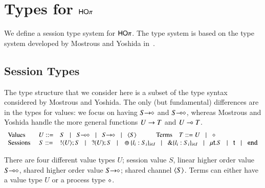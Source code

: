 \section{Types for $\mathsf{HO}\pi$}

We define a session type system for $\mathsf{HO}\pi$.
The type system is based on the type system developed by Mostrous
and Yoshida in~\cite{tlca07}.

\subsection{Session Types}

The type structure that we consider here is a subset of the type syntax considered by Mostrous and Yoshida.
The only (but fundamental) differences are in the types for values: we focus on having 
$S\!\! \rightarrow\!\! \diamond$ and $S\!\! \multimap\!\! \diamond$, whereas Mostrous and Yoshida handle the more general functions $U \rightarrow T$ and 
$U \multimap T$.
\[
	\begin{array}{lcl}
		\text{Values} & U ::= & S \bnfbar \lhot{S} \bnfbar \shot{S} \bnfbar \chtype{S} \qquad \quad \text{Terms} \quad T ::= U  \bnfbar  \Proc\\
		\text{Sessions} \ & S ::= &  \btout{U} S \bnfbar \btinp{U} S
		\bnfbar		\btsel{l_i:S_i}_{i \in I} \bnfbar \btbra{l_i:S_i}_{i \in I} \bnfbar \trec{t}{S} \bnfbar \vart{t}  \bnfbar \tinact 
	\end{array}
\]

There are four different value types $U$; session value $S$, linear higher order value $S\!\! \multimap\!\! \diamond$, 
shared higher order value $S\!\! \rightarrow\!\! \diamond$; shared channel $\langle S \rangle$. Terms can either have a
value type $U$ or a process type $\diamond$. 
